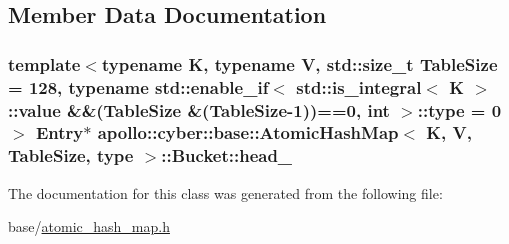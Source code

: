 \subsection{Member Data Documentation}
\hypertarget{classapollo_1_1cyber_1_1base_1_1AtomicHashMap_1_1Bucket_a4564f028e20a090f229c18968c4636b5}{
\subsubsection[{head\-\_\-}]{\setlength{\rightskip}{0pt plus 5cm}template$<$typename K, typename V, std\-::size\-\_\-t Table\-Size = 128, typename std\-::enable\-\_\-if$<$ std\-::is\-\_\-integral$<$ K $>$\-::value \&\&(\-Table\-Size \&(\-Table\-Size-\/1))==0, int $>$\-::type = 0$>$ {\bf Entry}$\ast$ {\bf apollo\-::cyber\-::base\-::\-Atomic\-Hash\-Map}$<$ K, V, Table\-Size, type $>$\-::Bucket\-::head\-\_\-}}\label{classapollo_1_1cyber_1_1base_1_1AtomicHashMap_1_1Bucket_a4564f028e20a090f229c18968c4636b5}


The documentation for this class was generated from the following file\-:\begin{DoxyCompactItemize}
\item 
base/\hyperlink{atomic__hash__map_8h}{atomic\-\_\-hash\-\_\-map.\-h}\end{DoxyCompactItemize}

